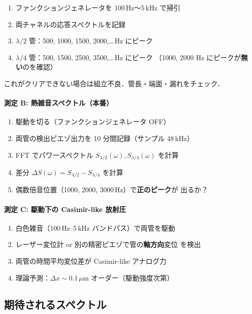 \documentclass[11pt,a4paper]{article}
\begin{document}
\begin{enumerate}
\item ファンクションジェネレータを 100\,Hz〜5\,kHz で掃引
\item 両チャネルの応答スペクトルを記録
\item $\lambda/2$ 管：500, 1000, 1500, 2000,\ldots\,Hz にピーク
\item $\lambda/4$ 管：500, 1500, 2500, 3500,\ldots\,Hz にピーク
（1000, 2000 Hz にピークが\textbf{無い}のを確認）
\end{enumerate}

これがクリアできない場合は組立不良．管長・端面・漏れをチェック．

\paragraph{測定 B: 熱雑音スペクトル（本番）}

\begin{enumerate}
\item 駆動を切る（ファンクションジェネレータ OFF）
\item 両管の検出ピエゾ出力を 10 分間記録（サンプル 48\,kHz）
\item FFT でパワースペクトル $S_{\lambda/2}(\omega), S_{\lambda/4}(\omega)$ を計算
\item 差分 $\Delta S(\omega) = S_{\lambda/2} - S_{\lambda/4}$ を計算
\item 偶数倍音位置（1000, 2000, 3000\,Hz）で\textbf{正のピーク}が
出るか？
\end{enumerate}

\paragraph{測定 C: 駆動下の Casimir-like 放射圧}

\begin{enumerate}
\item 白色雑音（100\,Hz--5\,kHz バンドパス）で両管を駆動
\item レーザー変位計 or 別の精密ピエゾで管の\textbf{軸方向}変位
を検出
\item 両管の時間平均変位差が Casimir-like アナログ力
\item 理論予測：$\Delta x \sim 0.1$\,$\mu$m オーダー（駆動強度次第）
\end{enumerate}

\subsection{期待されるスペクトル}
\end{document}
